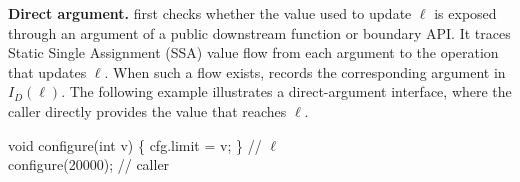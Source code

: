 

\noindent\textbf{Direct argument.}
\sys first checks whether the value used to update $\ell$ is exposed through an argument of a public downstream function or boundary API. It traces Static Single Assignment (SSA) value flow from each argument to the operation that updates $\ell$. When such a flow exists, \sys records the corresponding argument in $I_D(\ell)$. The following example illustrates a direct-argument interface, where the caller directly provides the value that reaches $\ell$.

\begin{tcolorbox}[
  colback=gray!8,
  colframe=gray!35,
  boxrule=0.4pt,
  arc=1pt,
  left=5pt,
  right=3pt,
  top=1pt,
  bottom=1pt
]
\small\ttfamily
void configure(int \textcolor{blue!77!black}{v}) \{ \textcolor{red!77!black}{cfg.limit} = \textcolor{blue!77!black}{v}; \}  \quad \textcolor{citegray}{// $\ell$}\\
configure(\textcolor{blue!77!black}{20000}); \quad \textcolor{citegray}{// caller}
\end{tcolorbox}


